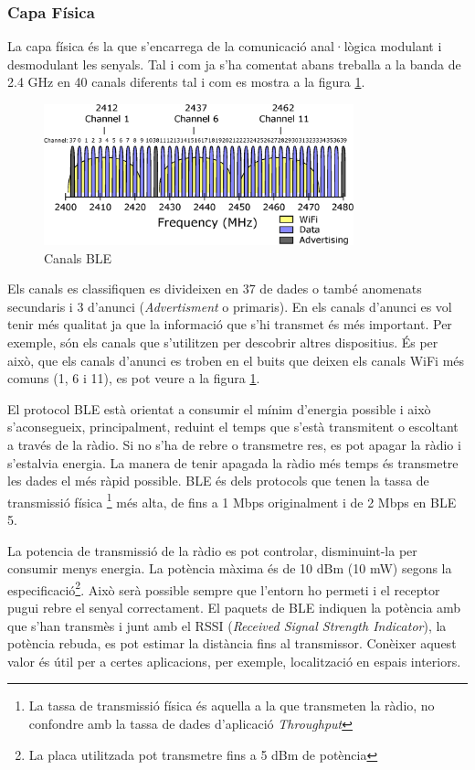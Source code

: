 \subsubsection{Capa Física}
La capa física és la que s'encarrega de la comunicació anal·lògica modulant i desmodulant les senyals.
Tal i com ja s'ha comentat abans treballa a la banda de 2.4 GHz en 40 canals diferents tal i com es mostra a la figura \ref{BLE_Channels}.

\begin{figure}[hb]
	\begin{center}
		\includegraphics[width=0.8\textwidth]{./diagrames/BLE_WiFi}
		\caption{Canals BLE}
		\label{BLE_Channels}
	\end{center}
\end{figure}

Els canals es classifiquen es divideixen en 37 de dades o també anomenats secundaris i 3 d'anunci (\textit{Advertisment} o primaris).
En els canals d'anunci es vol tenir més qualitat ja que la informació que s'hi transmet és més important.
Per exemple, són els canals que s'utilitzen per descobrir altres dispositius.
És per això, que els canals d'anunci es troben en el buits que deixen els canals WiFi més comuns (1, 6 i 11), es pot veure a la figura \ref{BLE_Channels}.

El protocol BLE està orientat a consumir el mínim d'energia possible i això s'aconsegueix, principalment, reduint el temps que s'està transmitent o escoltant a través de la ràdio.
Si no s'ha de rebre o transmetre res, es pot apagar la ràdio i s'estalvia energia.
La manera de tenir apagada la ràdio més temps és transmetre les dades el més ràpid possible.
BLE és dels protocols que tenen la tassa de transmissió física \footnote{La tassa de transmissió física és aquella a la que transmeten la ràdio, no confondre amb la tassa de dades d'aplicació \textit{Throughput}} més alta, de fins a 1 Mbps originalment i de 2 Mbps en BLE 5.

La potencia de transmissió de la ràdio es pot controlar, disminuint-la per consumir menys energia.
La potència màxima és de 10 dBm (10 mW) segons la especificació\footnote{La placa utilitzada pot transmetre fins a 5 dBm de potència}.
Això serà possible sempre que l'entorn ho permeti i el receptor pugui rebre el senyal correctament.
El paquets de BLE indiquen la potència amb que s'han transmès i junt amb el RSSI (\textit{Received Signal Strength Indicator}), la potència rebuda, es pot estimar la distància fins al transmissor.
Conèixer aquest valor és útil per a certes aplicacions, per exemple, localització en espais interiors.

